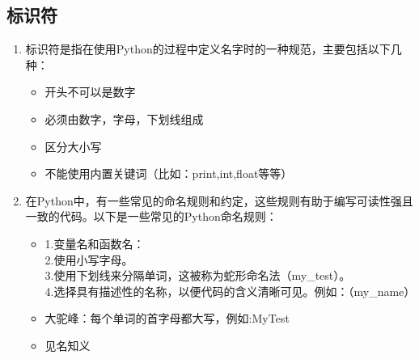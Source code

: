 
\subsection{标识符}

\begin{enumerate}
\item 标识符是指在使用Python的过程中定义名字时的一种规范，主要包括以下几种：
\begin{itemize}
\item 开头不可以是数字
\item 必须由数字，字母，下划线组成
\item 区分大小写
\item 不能使用内置关键词（比如：print,int,float等等）
\end{itemize}
\item 在Python中，有一些常见的命名规则和约定，这些规则有助于编写可读性强且一致的代码。以下是一些常见的Python命名规则：
\begin{itemize}
\item
1.变量名和函数名：\\
2.使用小写字母。\\
3.使用下划线来分隔单词，这被称为蛇形命名法（my_test）。\\
4.选择具有描述性的名称，以便代码的含义清晰可见。例如：（my_name）

\item 大驼峰：每个单词的首字母都大写，例如:MyTest 
\item 见名知义
\end{itemize}
\end{enumerate}